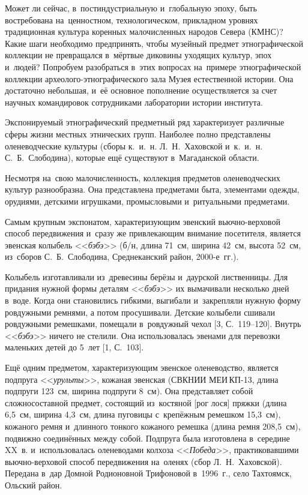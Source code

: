  

\makeProcTitle
{}

Может ли сейчас, в~постиндустриальную и~глобальную эпоху, быть востребована на~ценностном, технологическом, прикладном уровнях традиционная культура коренных малочисленных народов Севера (КМНС)? Какие шаги необходимо предпринять, чтобы музейный предмет этнографической коллекции не превращался в~мёртвые диковины уходящих культур, эпох и~людей? Попробуем разобраться в~этих вопросах на~примере этнографической коллекции археолого-этнографического зала Музея естественной истории. Она достаточно небольшая, и~её основное пополнение осуществляется за счет научных командировок сотрудниками лаборатории истории института.

Экспонируемый этнографический предметный ряд характеризует различные сферы жизни местных этнических групп. Наиболее полно представлены оленеводческие культуры (сборы к.~и.~н. Л.~Н.~Хаховской и~к.~и.~н. С.~Б.~Слободина), которые ещё существуют в~Магаданской области.

Несмотря на~свою малочисленность, коллекция предметов оленеводческих культур разнообразна. Она представлена предметами быта, элементами одежды, орудиями, детскими игрушками, промысловыми и~ритуальными предметами.

Самым крупным экспонатом, характеризующим эвенский вьючно-вер\-хо\-вой способ передвижения и~сразу же привлекающим внимание посетителя, является эвенская колыбель <<\textit{бэбэ}>> (б/н, длина 71~см, ширина 42~см, высота 52~см, из~сборов С.~Б.~Слободина, Среднеканский район, 2000-е~гг.).

Колыбель изготавливали из~древесины берёзы и~даурской лиственницы. Для придания нужной формы деталям <<\textit{бэбэ}>> их вымачивали несколько дней в~воде. Когда они становились гибкими, выгибали и~закрепляли нужную форму ровдужными ремнями, а потом просушивали. Детские колыбели сшивали ровдужными ремешками, помещали в~ровдужный чехол [3, С.~119--120]. Внутрь <<\textit{бэбэ}>> ничего не стелили. Она использовалась эвенами для перевозки маленьких детей до 5~лет [1, С.~103].

Ещё одним предметом, характеризующим эвенское оленеводство, является подпруга <<\textit{урульты}>>, кожаная эвенская (СВКНИИ МЕИ\,КП-13, длина подпруги 123~см, ширина подпруги 8~см). Она представляет собой сложносоставной предмет, состоящий из~костяной [рог лося] пряжки (длина 6,5~см, ширина 4,3~см, длина пуговицы с~крепёжным ремешком 15,3~см), кожаного ремня и~длинного тонкого кожаного ремешка (длина ремня 208,5~см), подвижно соединённых между собой. Подпруга была изготовлена в~середине XX~в. и~использовалась оленеводами колхоза <<\textit{Победа}>>, практиковавшими вьючно-верховой способ передвижения на~оленях (сбор Л.~Н.~Хаховской). Передана в~дар Домной Родионовной Трифоновой в~1996~г., село Тахтоямск, Ольский район.

